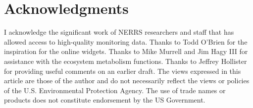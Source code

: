 \section{Acknowledgments}

I acknowledge the significant work of NERRS researchers and staff that has allowed access to high-quality monitoring data.  Thanks to Todd O'Brien for the inspiration for the online widgets. Thanks to Mike Murrell and Jim Hagy III for assistance with the ecosystem metabolism functions. Thanks to Jeffrey Hollister for providing useful comments on an earlier draft.  The views expressed in this article are those of the author and do not necessarily reflect the views or policies of the U.S. Environmental Protection Agency.  The use of trade names or products does not constitute endorsement by the US Government.   



\address{Marcus W Beck\\
  ORISE Research Participation Program\\
  USEPA National Health and Environmental Effects Research Laboratory, Gulf Ecology Division\\
  1 Sabine Island Drive, Gulf Breeze, FL 32651\\
  USA\\}
